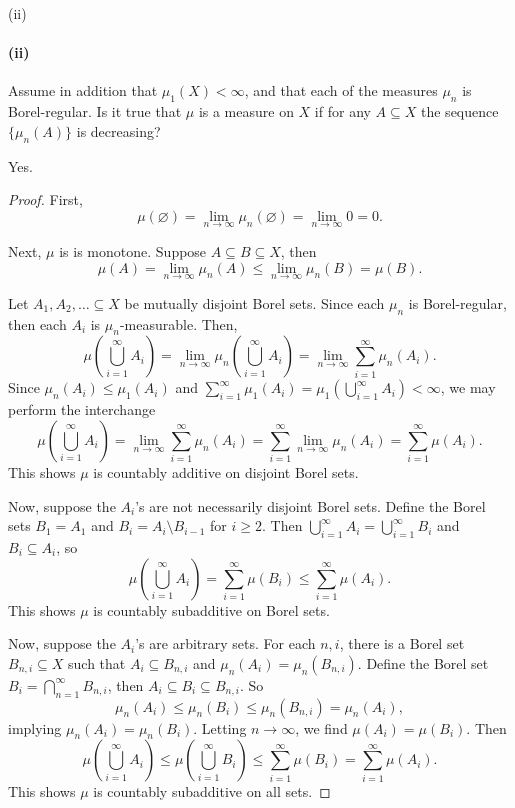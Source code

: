 \documentclass[12pt]{article}
\newlength{\myparskip}
\newenvironment{fullbox}{\begin{lrbox}{\savefullbox}\begin{minipage}{\dimexpr\textwidth-2\fboxsep\relax}\setlength{\parskip}{\myparskip}}{\end{minipage}\end{lrbox}\framebox[\textwidth]{\usebox{\savefullbox}}}
\newenvironment{pbox}[1][]{\begin{fullbox}\ifx#1\empty\else\paragraph{#1}\fi}{\end{fullbox}}
\renewcommand{\emptyset}{\varnothing}
\newcommand{\<}{\langle}
\renewcommand{\>}{\rangle}
\begin{document}
\newpage
\begin{pbox}[(ii)]
    Assume in addition that $\mu_1(X) < \infty$, and that each of the measures $\mu_n$ is Borel-regular. Is it true that $\mu$ is a measure on $X$ if for any $A \subseteq X$ the sequence $\{\mu_n(A)\}$ is decreasing?
\end{pbox}

Yes.

\begin{proof}
    First,
    \[
        \mu(\emptyset)
            = \lim_{n \to \infty} \mu_n(\emptyset)
            = \lim_{n \to \infty} 0
            = 0.
    \]
    
    Next, $\mu$ is is monotone. Suppose $A \subseteq B \subseteq X$, then
    \[
        \mu(A)
            = \lim_{n \to \infty} \mu_n(A)
            \leq \lim_{n \to \infty} \mu_n(B)
            = \mu(B).
    \]



    Let $A_1, A_2, \dots \subseteq X$ be mutually disjoint Borel sets. Since each $\mu_n$ is Borel-regular, then each $A_i$ is $\mu_n$-measurable. Then,
    \[
        \mu\left(\bigcup_{i=1}^{\infty} A_i\right)
            = \lim_{n \to \infty} \mu_n\left(\bigcup_{i=1}^{\infty} A_i\right)
            = \lim_{n \to \infty} \sum_{i=1}^{\infty} \mu_n(A_i).
    \]
    Since $\mu_n(A_i) \leq \mu_1(A_i)$ and $\sum_{i=1}^{\infty} \mu_1(A_i) = \mu_1(\bigcup_{i=1}^{\infty} A_i) < \infty$, we may perform the interchange
    \[
        \mu\left(\bigcup_{i=1}^{\infty} A_i\right)
            = \lim_{n \to \infty} \sum_{i=1}^{\infty} \mu_n(A_i)
            = \sum_{i=1}^{\infty} \lim_{n \to \infty} \mu_n(A_i)
            = \sum_{i=1}^{\infty} \mu(A_i).
    \]
    This shows $\mu$ is countably additive on disjoint Borel sets.

    Now, suppose the $A_i$'s are not necessarily disjoint Borel sets. Define the Borel sets $B_1 = A_1$ and $B_i = A_i \setminus B_{i-1}$ for $i \geq 2$. Then $\bigcup_{i=1}^{\infty} A_i = \bigcup_{i=1}^{\infty} B_i$ and $B_i \subseteq A_i$, so
    \[
        \mu\left(\bigcup_{i=1}^{\infty} A_i\right)
            = \sum_{i=1}^{\infty} \mu(B_i)
            \leq \sum_{i=1}^{\infty} \mu(A_i).
    \]
    This shows $\mu$ is countably subadditive on Borel sets.

    Now, suppose the $A_i$'s are arbitrary sets. For each $n, i$, there is a Borel set $B_{n, i} \subseteq X$ such that $A_i \subseteq B_{n,i}$ and $\mu_n(A_i) = \mu_n(B_{n,i})$. Define the Borel set $B_i = \bigcap_{n=1}^{\infty} B_{n,i}$, then $A_i \subseteq B_i \subseteq B_{n,i}$. So
    \[
        \mu_n(A_i) \leq \mu_n(B_i) \leq \mu_n(B_{n,i}) = \mu_n(A_i),
    \]
    implying $\mu_n(A_i) = \mu_n(B_i)$. Letting $n \to \infty$, we find $\mu(A_i) = \mu(B_i)$. Then
    \[
        \mu\left(\bigcup_{i=1}^{\infty} A_i\right)
            \leq \mu\left(\bigcup_{i=1}^{\infty} B_i\right)
            \leq \sum_{i=1}^{\infty} \mu(B_i)
            = \sum_{i=1}^{\infty} \mu(A_i).
    \]
    This shows $\mu$ is countably subadditive on all sets.


\end{proof}
\end{document}
